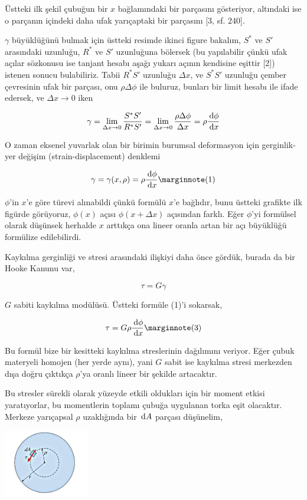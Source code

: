 \documentclass[12pt,fleqn]{article}\usepackage{../../common}
\begin{document}
Üstteki ilk şekil çubuğun bir $x$ bağlamındaki bir parçasını gösteriyor,
altındaki ise o parçanın içindeki daha ufak yarıçaptaki bir parçasını [3, sf. 240]. 

$\gamma$ büyüklüğünü bulmak için üstteki resimde ikinci figure bakalım, $S^*$ ve
$S'$ arasındaki uzunluğu, $R^*$ ve $S'$ uzunluğuna bölersek (bu yapılabilir
çünkü ufak açılar sözkonusu ise tanjant hesabı aşağı yukarı açının kendisine
eşittir [2]) istenen sonucu bulabiliriz. Tabii $R^*S'$ uzunluğu $\Delta x$,
ve $S^*S'$ uzunluğu çember çevresinin ufak bir parçası, onu  $\rho \Delta \phi$
ile buluruz, bunları bir limit hesabı ile ifade edersek, ve $\Delta x \to 0$
iken

$$
\gamma = \lim_{\Delta x \to 0} \frac{S^*S'}{R^*S'} =
\lim_{\Delta x \to 0} \frac{\rho \Delta \phi}{\Delta x} =
\rho \frac{\,\mathrm{d} \phi}{\,\mathrm{d} x}
$$

O zaman eksenel yuvarlak olan bir birimin burumsal deformasyon için
gerginlik-yer değişim (strain-displacement) denklemi

$$
\gamma = \gamma(x,\rho) = \rho \frac{\ud \phi}{\ud x}
\mlabel{1}
$$

$\phi$'in $x$'e göre türevi alınabildi çünkü formülü $x$'e bağlıdır, bunu
üstteki grafikte ilk figürde görüyoruz, $\phi(x)$ açısı $\phi(x+\Delta x)$
açısından farklı. Eğer $\phi$'yi formülsel olarak düşünsek herhalde $x$ arttıkça
ona lineer oranla artan bir açı büyüklüğü formülize edilebilirdi.

Kaykılma gerginliği ve stresi arasındaki ilişkiyi daha önce gördük, burada da
bir Hooke Kanunu var,

$$
\tau = G \gamma
$$

$G$ sabiti kaykılma modülüsü. Üstteki formüle (1)'i sokarsak,

$$
\tau = G \rho \frac{\ud \phi}{\ud x}
\mlabel{3}
$$

Bu formül bize bir kesitteki kaykılma streslerinin dağılımını veriyor. Eğer
çubuk materyeli homojen (her yerde aynı), yani $G$ sabit ise kaykılma stresi
merkezden dışa doğru çıktıkça $\rho$'ya oranlı lineer bir şekilde artacaktır.

Bu stresler sürekli olarak yüzeyde etkili oldukları için bir moment etkisi
yaratıyorlar, bu momentlerin toplamı çubuğa uygulanan torka eşit
olacaktır. Merkeze yarıçapsal $\rho$ uzaklığında bir $\,\mathrm{d} A$ parçası düşünelim,

\includegraphics[width=10em]{phy_020_strs_06_04.jpg}
\end{document}
